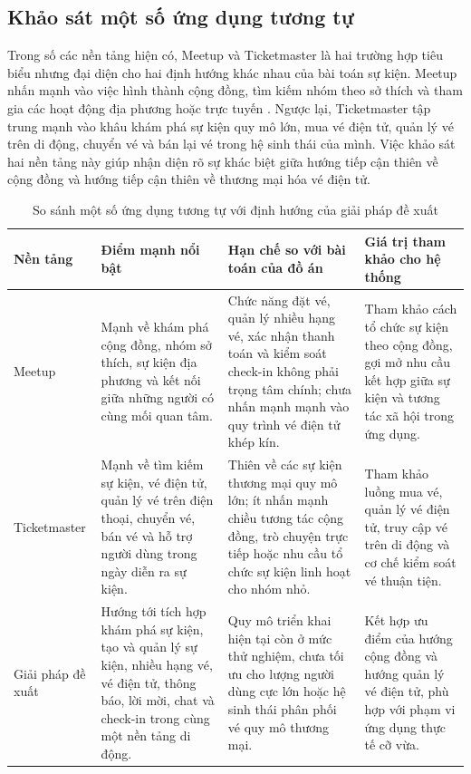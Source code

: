 \documentclass[../DoAn.tex]{subfiles}
\begin{document}
\subsection{Khảo sát một số ứng dụng tương tự}
Trong số các nền tảng hiện có, Meetup và Ticketmaster là hai trường hợp tiêu biểu nhưng đại diện cho hai định hướng khác nhau của bài toán sự kiện. Meetup nhấn mạnh vào việc hình thành cộng đồng, tìm kiếm nhóm theo sở thích và tham gia các hoạt động địa phương hoặc trực tuyến \cite{meetup2026about}. Ngược lại, Ticketmaster tập trung mạnh vào khâu khám phá sự kiện quy mô lớn, mua vé điện tử, quản lý vé trên di động, chuyển vé và bán lại vé trong hệ sinh thái của mình. Việc khảo sát hai nền tảng này giúp nhận diện rõ sự khác biệt giữa hướng tiếp cận thiên về cộng đồng và hướng tiếp cận thiên về thương mại hóa vé điện tử.

\begin{table}[H]
\centering
\renewcommand{\arraystretch}{1.3}
\begin{tabular}{|p{2.7cm}|p{3.5cm}|p{3.8cm}|p{3.8cm}|}
\hline
\textbf{Nền tảng} & \textbf{Điểm mạnh nổi bật} & \textbf{Hạn chế so với bài toán của đồ án} & \textbf{Giá trị tham khảo cho hệ thống} \\
\hline
Meetup \cite{meetup2026about} & Mạnh về khám phá cộng đồng, nhóm sở thích, sự kiện địa phương và kết nối giữa những người có cùng mối quan tâm. & Chức năng đặt vé, quản lý nhiều hạng vé, xác nhận thanh toán và kiểm soát check-in không phải trọng tâm chính; chưa nhấn mạnh mạnh vào quy trình vé điện tử khép kín. & Tham khảo cách tổ chức sự kiện theo cộng đồng, gợi mở nhu cầu kết hợp giữa sự kiện và tương tác xã hội trong ứng dụng. \\
\hline
Ticketmaster & Mạnh về tìm kiếm sự kiện, vé điện tử, quản lý vé trên điện thoại, chuyển vé, bán vé và hỗ trợ người dùng trong ngày diễn ra sự kiện. & Thiên về các sự kiện thương mại quy mô lớn; ít nhấn mạnh chiều tương tác cộng đồng, trò chuyện trực tiếp hoặc nhu cầu tổ chức sự kiện linh hoạt cho nhóm nhỏ. & Tham khảo luồng mua vé, quản lý vé điện tử, truy cập vé trên di động và cơ chế kiểm soát vé thuận tiện. \\
\hline
Giải pháp đề xuất & Hướng tới tích hợp khám phá sự kiện, tạo và quản lý sự kiện, nhiều hạng vé, vé điện tử, thông báo, lời mời, chat và check-in trong cùng một nền tảng di động. & Quy mô triển khai hiện tại còn ở mức thử nghiệm, chưa tối ưu cho lượng người dùng cực lớn hoặc hệ sinh thái phân phối vé quy mô thương mại. & Kết hợp ưu điểm của hướng cộng đồng và hướng quản lý vé điện tử, phù hợp với phạm vi ứng dụng thực tế cỡ vừa. \\
\hline
\end{tabular}
\caption{So sánh một số ứng dụng tương tự với định hướng của giải pháp đề xuất}
\label{table:app-comparison}
\end{table}
\end{document}
